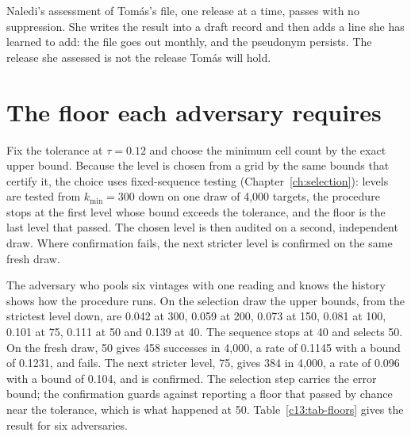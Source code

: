Naledi's assessment of Tomás's file, one release at a time, passes with no
suppression. She writes the result into a draft record and then adds a line she has
learned to add: the file goes out monthly, and the pseudonym persists. The release
she assessed is not the release Tomás will hold.

\section{The floor each adversary requires}\label{c13:sec-floors}

Fix the tolerance at $\tau=0.12$ and choose the minimum cell count by the exact upper
bound. Because the level is chosen from a grid by the same bounds that certify it,
the choice uses fixed-sequence testing (Chapter~\ref{ch:selection}): levels are
tested from $k_{\min}=300$ down on one draw of 4{,}000 targets, the procedure stops
at the first level whose bound exceeds the tolerance, and the floor is the last level
that passed. The chosen level is then audited on a second, independent draw. Where
confirmation fails, the next stricter level is confirmed on the same fresh draw.

The adversary who pools six vintages with one reading and knows the history shows
how the procedure runs. On the selection draw the upper bounds, from the strictest
level down, are 0.042 at 300, 0.059 at 200, 0.073 at 150, 0.081 at 100, 0.101 at 75,
0.111 at 50 and 0.139 at 40. The sequence stops at 40 and selects 50. On the fresh
draw, 50 gives 458 successes in 4{,}000, a rate of 0.1145 with a bound of 0.1231, and
fails. The next stricter level, 75, gives 384 in 4{,}000, a rate of 0.096 with a bound
of 0.104, and is confirmed.
The selection step carries the error bound; the confirmation guards against
reporting a floor that passed by chance near the tolerance, which is what happened
at 50. Table~\ref{c13:tab-floors} gives the result for six adversaries.

